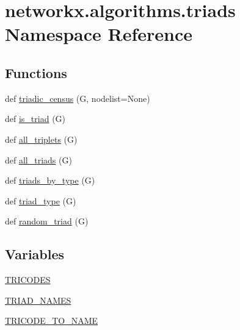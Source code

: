 \hypertarget{namespacenetworkx_1_1algorithms_1_1triads}{}\section{networkx.\+algorithms.\+triads Namespace Reference}
\label{namespacenetworkx_1_1algorithms_1_1triads}
\subsection*{Functions}
\begin{DoxyCompactItemize}
\item 
def \hyperlink{namespacenetworkx_1_1algorithms_1_1triads_af7fe7f5b5c6cf60ccc70b1013322e44f}{triadic\+\_\+census} (G, nodelist=None)
\item 
def \hyperlink{namespacenetworkx_1_1algorithms_1_1triads_a8e517109435db9749833086107a52117}{is\+\_\+triad} (G)
\item 
def \hyperlink{namespacenetworkx_1_1algorithms_1_1triads_a5e1dcc7531b5b1b5486369cf5aed74fd}{all\+\_\+triplets} (G)
\item 
def \hyperlink{namespacenetworkx_1_1algorithms_1_1triads_a662f3ef88be1460e066f8340b568c4c8}{all\+\_\+triads} (G)
\item 
def \hyperlink{namespacenetworkx_1_1algorithms_1_1triads_abe8b8e8df71b88e5d63a378f8ae03f23}{triads\+\_\+by\+\_\+type} (G)
\item 
def \hyperlink{namespacenetworkx_1_1algorithms_1_1triads_aa61741a7f9abacb117f4dfe6651d51f8}{triad\+\_\+type} (G)
\item 
def \hyperlink{namespacenetworkx_1_1algorithms_1_1triads_a9a4217f662df5f5ad284364071f93975}{random\+\_\+triad} (G)
\end{DoxyCompactItemize}
\subsection*{Variables}
\begin{DoxyCompactItemize}
\item 
\hyperlink{namespacenetworkx_1_1algorithms_1_1triads_a140bb6710cea1a743b3310181d784a3b}{T\+R\+I\+C\+O\+D\+ES}
\item 
\hyperlink{namespacenetworkx_1_1algorithms_1_1triads_a2401dcd8aadb80af7eed59bca881e832}{T\+R\+I\+A\+D\+\_\+\+N\+A\+M\+ES}
\item 
\hyperlink{namespacenetworkx_1_1algorithms_1_1triads_aae64f17950d4a54566a1438c3acc4a60}{T\+R\+I\+C\+O\+D\+E\+\_\+\+T\+O\+\_\+\+N\+A\+ME}
\end{DoxyCompactItemize}


